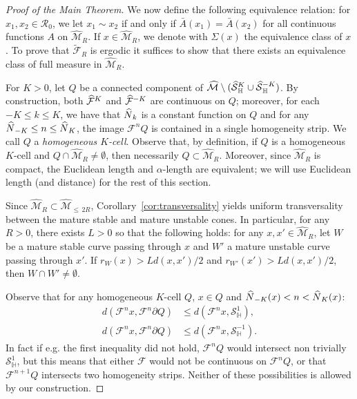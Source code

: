 \documentclass[10pt]{amsart}
\theoremstyle{definition}\newtheorem{defi}[theo]{Definition}\newtheorem{rema}[theo]{Remark}\newtheorem{exam}[theo]{Example}\newtheorem{exem}[theo]{Example}\newtheorem{nota}[theo]{Notation}
\newcommand{\homo}{\mathbb{H}}
\newcommand{\cR}{\mathcal{R}}
\newcommand{\cm}{\mathcal{F}}
\newcommand{\csp}{\mathcal{M}}
\newcommand{\cmp}{\hat\cm}
\newcommand{\cspi}{\widehat{\csp}}
\newcommand{\cspiu}[1]{\widehat{\csp}_{\le\,#1}}
\newcommand{\brA}{\bar{A}}
\newcommand{\tcF}{\widetilde{\mathcal{F}}}
\newcommand{\singPrivate}{\mathcal{S}}
\newcommand{\hsing}[1]{{\singPrivate}_\homo^{#1}}
\newcommand{\hsingp}[1]{\hat{\singPrivate}_\homo^{#1}}
\newcommand{\admName}{\alpha^{+}}
\newcommand{\Np}{\hat N}
\renewcommand{\admName}{\alpha}
\let\oldhat\hat
\renewcommand*{\hat}[1]{\mathchoice{\widehat{#1}}{\widehat{#1}}{\oldhat{#1}}{\oldhat{#1}}}
\begin{document}
\begin{proof}[Proof of the Main Theorem]
We now define the following equivalence relation: for $x_{1},x_{2}\in\cR_{0}$, we let $x_1\sim x_2$ if and only if $\brA(x_1)=\brA(x_2)$ for all continuous functions $A$ on $\cspi_R$. If $x\in\cspi_{R}$, we denote with $\Sigma(x)$ the equivalence class of $x$. To prove that $\tcF_R$ is ergodic it suffices to show that there exists an equivalence class of full measure in $\cspi_R$.

For $K > 0$, let $Q$ be a connected component of $\cspi\setminus(\hsingp{K}\cup\hsingp{-K})$. By construction, both $\cmp^K$ and $\cmp^{-K}$ are continuous on $Q$; moreover, for each $-K\le k\le K$, we have that $\Np_{k}$ is a constant function on $Q$ and for any $\Np_{-K}\le n\le\Np_{K}$, the image $\cm^{n}Q$ is contained in a single homogeneity strip. We call $Q$ a \emph{homogeneous $K$-cell}. Observe that, by definition, if $Q$ is a homogeneous $K$-cell and $Q\cap\cspi_{R}\ne\emptyset$, then necessarily $Q\subset\cspi_{R}$. Moreover, since $\cspi_{R}$ is compact, the Euclidean length and $\admName$-length are equivalent; we will use Euclidean length (and distance) for the rest of this section.

Since $\cspi_{R}\subset\cspiu{2R}$, Corollary~\ref{cor:transversality} yields uniform transversality between the mature stable and mature unstable cones. In particular, for any $R > 0$, there exists $L> 0$ so that the following holds: for any $x, x'\in\cspi_{R}$, let $W$ be a mature stable curve passing through $x$ and $W'$ a mature unstable curve passing through $x'$. If $r_{W}(x) > Ld(x,x')/2$ and $r_{W'}(x') > Ld(x,x')/2$, then $W\cap W'\ne\emptyset$.

Observe that for any homogeneous $K$-cell $Q$, $x\in Q$ and $\Np_{-K}(x) < n < \Np_{K}(x)$:
\begin{align*}
d\left(\cm^{n}x,\cm^{n}\partial Q\right) &\le d\left(\cm^{n}x,\hsing1\right),\\
d\left(\cm^{n}x,\cm^{n}\partial Q\right) &\le d\left(\cm^{n}x,\hsing{-1}\right).
\end{align*}
In fact if e.g. the first inequality did not hold, $\cm^{n}Q$ would intersect non trivially $\hsing1$, but this means that either $\cm$ would not be continuous on $\cm^{n}Q$, or that $\cm^{n+1}Q$ intersects two homogeneity strips. Neither of these possibilities is allowed by our construction.


\end{proof}
\end{document}
